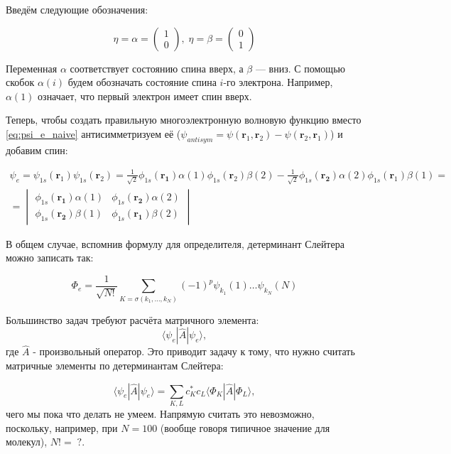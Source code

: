 \documentclass[12pt, oneside]{article}
\numberwithin{equation}{section}  %
\begin{document}
Введём следующие обозначения:

\begin{equation}
    \eta = \alpha = \begin{pmatrix} 1 \\ 0 \end{pmatrix}, \;
    \eta = \beta = \begin{pmatrix} 0 \\ 1 \end{pmatrix}
\end{equation}

Переменная \(\alpha\) соответствует состоянию спина вверх, а \(\beta\) — вниз. С помощью скобок \(\alpha(i)\) будем обозначать состояние спина \(i\)-го электрона. Например, \(\alpha(1)\) означает, что первый электрон имеет спин вверх. 

Теперь, чтобы создать правильную многоэлектронную волновую функцию вместо \eqref{eq:psi_e_naive} антисимметризуем её (\(\psi_{antisym} = \psi(\bm{r}_1, \bm{r}_2) - \psi(\bm{r}_2, \bm{r}_1)\)) и добавим спин:

\begin{multline}
\psi_e = \psi_{1s} (\bm{r}_1) \psi_{1s} (\bm{r}_2) = \frac{1}{\sqrt{2}} \phi_{1s} (\bm{r_1}) \alpha(1) \phi_{1s} (\bm{r}_2) \beta(2) - \frac{1}{\sqrt{2}} \phi_{1s} (\bm{r_2}) \alpha(2) \phi_{1s} (\bm{r}_1) \beta(1) =\\=
\begin{vmatrix}
\phi_{1s} (\bm{r_1}) \alpha(1) & \phi_{1s} (\bm{r_2}) \alpha(2) \\
\phi_{1s} (\bm{r_2}) \beta(1) & \phi_{1s} (\bm{r_1}) \beta(2)
\end{vmatrix}
\end{multline}

В общем случае, вспомнив формулу для определителя, детерминант Слейтера можно записать так:

\begin{equation}
    \Phi_e = \dfrac{1}{\sqrt{N!}} \sum_{K = \sigma(k_1, \dots, k_N)} (-1)^p \psi_{k_1} (1) \dots \psi_{k_N} (N)
\end{equation}

Большинство задач требуют расчёта матричного элемента:
\begin{equation}
    \langle \psi_e | \hat{A} | \psi_e \rangle,
\end{equation}
где \(\hat{A}\) - произвольный оператор. Это приводит задачу к тому, что нужно считать матричные элементы по детерминантам Слейтера:

\begin{equation}
\langle \psi_e | \hat{A} | \psi_e \rangle = \sum_{K, L} c_K^* c_L \langle \Phi_K | \hat{A} | \Phi_L \rangle,
\end{equation}
чего мы пока что делать не умеем. Напрямую считать это невозможно, поскольку, например, при \(N = 100\) (вообще говоря типичное значение для молекул), \(N! = \; ?\).
\end{document}
